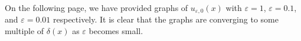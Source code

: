 \documentclass[12pt,reqno]{amsart}
\numberwithin{equation}{section}  %
\newcommand{\ee}{\varepsilon}
\begin{document}
          On the following page, we have provided graphs of
          $u_{\ee,0}(x)$ with $\ee = 1$, $\ee = 0.1$, and $\ee = 0.01$
          respectively. It is clear that the graphs are converging to some
          multiple of $\delta(x)$ as $\ee$ becomes small.
          \newpage
\begin{figure}[!ht]
  \begin{center}
  \vspace{-30mm}
\hspace{-20mm}
\\
\vspace{-30mm}
\end{center}
\end{figure}
%
%
%
\end{document}
